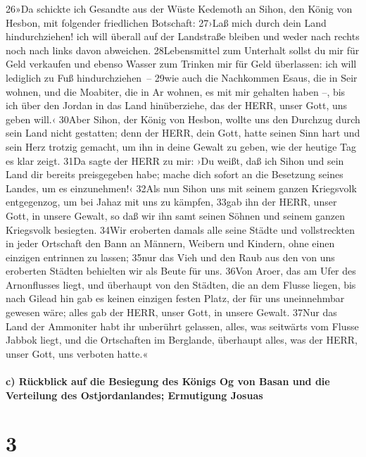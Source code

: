 26»Da schickte ich Gesandte aus der Wüste Kedemoth an Sihon, den König
von Hesbon, mit folgender friedlichen Botschaft: 27›Laß mich durch dein
Land hindurchziehen! ich will überall auf der Landstraße bleiben und
weder nach rechts noch nach links davon abweichen. 28Lebensmittel zum
Unterhalt sollst du mir für Geld verkaufen und ebenso Wasser zum Trinken
mir für Geld überlassen: ich will lediglich zu Fuß hindurchziehen~--
29wie auch die Nachkommen Esaus, die in Seir wohnen, und die Moabiter,
die in Ar wohnen, es mit mir gehalten haben --, bis ich über den Jordan
in das Land hinüberziehe, das der HERR, unser Gott, uns geben will.‹
30Aber Sihon, der König von Hesbon, wollte uns den Durchzug durch sein
Land nicht gestatten; denn der HERR, dein Gott, hatte seinen Sinn hart
und sein Herz trotzig gemacht, um ihn in deine Gewalt zu geben, wie der
heutige Tag es klar zeigt. 31Da sagte der HERR zu mir: ›Du weißt, daß
ich Sihon und sein Land dir bereits preisgegeben habe; mache dich sofort
an die Besetzung seines Landes, um es einzunehmen!‹ 32Als nun Sihon uns
mit seinem ganzen Kriegsvolk entgegenzog, um bei Jahaz mit uns zu
kämpfen, 33gab ihn der HERR, unser Gott, in unsere Gewalt, so daß wir
ihn samt seinen Söhnen und seinem ganzen Kriegsvolk besiegten. 34Wir
eroberten damals alle seine Städte und vollstreckten in jeder Ortschaft
den Bann an Männern, Weibern und Kindern, ohne einen einzigen entrinnen
zu lassen; 35nur das Vieh und den Raub aus den von uns eroberten Städten
behielten wir als Beute für uns. 36Von Aroer, das am Ufer des
Arnonflusses liegt, und überhaupt von den Städten, die an dem Flusse
liegen, bis nach Gilead hin gab es keinen einzigen festen Platz, der für
uns uneinnehmbar gewesen wäre; alles gab der HERR, unser Gott, in unsere
Gewalt. 37Nur das Land der Ammoniter habt ihr unberührt gelassen, alles,
was seitwärts vom Flusse Jabbok liegt, und die Ortschaften im Berglande,
überhaupt alles, was der HERR, unser Gott, uns verboten hatte.«

\hypertarget{c-ruxfcckblick-auf-die-besiegung-des-kuxf6nigs-og-von-basan-und-die-verteilung-des-ostjordanlandes-ermutigung-josuas}{%
\paragraph{c) Rückblick auf die Besiegung des Königs Og von Basan und
die Verteilung des Ostjordanlandes; Ermutigung
Josuas}\label{c-ruxfcckblick-auf-die-besiegung-des-kuxf6nigs-og-von-basan-und-die-verteilung-des-ostjordanlandes-ermutigung-josuas}}

\hypertarget{section-2}{%
\section{3}\label{section-2}}

